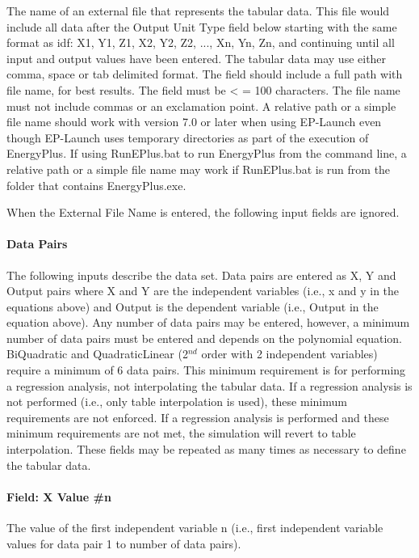 The name of an external file that represents the tabular data. This file would include all data after the Output Unit Type field below starting with the same format as idf: X1, Y1, Z1, X2, Y2, Z2, ..., Xn, Yn, Zn, and continuing until all input and output values have been entered. The tabular data may use either comma, space or tab delimited format. The field should include a full path with file name, for best results. The field must be \textless{} = 100 characters. The file name must not include commas or an exclamation point. A relative path or a simple file name should work with version 7.0 or later when using EP-Launch even though EP-Launch uses temporary directories as part of the execution of EnergyPlus. If using RunEPlus.bat to run EnergyPlus from the command line, a relative path or a simple file name may work if RunEPlus.bat is run from the folder that contains EnergyPlus.exe.

When the External File Name is entered, the following input fields are ignored.

\paragraph{Data Pairs}\label{data-pairs-1}

The following inputs describe the data set. Data pairs are entered as X, Y and Output pairs where X and Y are the independent variables (i.e., x and y in the equations above) and Output is the dependent variable (i.e., Output in the equation above). Any number of data pairs may be entered, however, a minimum number of data pairs must be entered and depends on the polynomial equation. BiQuadratic and QuadraticLinear (2\(^{nd}\) order with 2 independent variables) require a minimum of 6 data pairs. This minimum requirement is for performing a regression analysis, not interpolating the tabular data. If a regression analysis is not performed (i.e., only table interpolation is used), these minimum requirements are not enforced. If a regression analysis is performed and these minimum requirements are not met, the simulation will revert to table interpolation. These fields may be repeated as many times as necessary to define the tabular data.

\paragraph{Field: X Value \#n}\label{field-x-value-n-1}

The value of the first independent variable n (i.e., first independent variable values for data pair 1 to number of data pairs).


